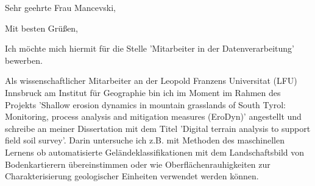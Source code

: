 \documentclass[11pt,a4paper,sans]{moderncv}        %
\begin{document}

\date{15. Dezember 2017}
\opening{Sehr geehrte Frau Mancevski,}
\closing{Mit besten Gr\"{u}{\ss}en,}

\makelettertitle
\justify
Ich m\"{o}chte mich hiermit f\"{u}r die Stelle 'Mitarbeiter in der Datenverarbeitung' bewerben.

Als wissenschaftlicher Mitarbeiter an der Leopold Franzens Universitat (LFU) Innsbruck am Institut f\"ur Geographie bin ich im Moment im Rahmen des Projekts 'Shallow erosion dynamics in mountain grasslands of South Tyrol: Monitoring, process analysis and mitigation measures (EroDyn)' angestellt und schreibe an meiner Dissertation mit dem Titel 'Digital terrain analysis to support field soil survey'. Darin untersuche ich z.B. mit Methoden des maschinellen Lernens ob automatisierte Gel\"andeklassifikationen mit dem Landschaftsbild von Bodenkartierern \"ubereinstimmen oder wie Oberfl\"achenrauhigkeiten zur Charakterisierung geologischer Einheiten verwendet werden k\"onnen.
\end{document}

